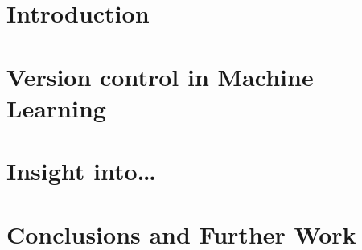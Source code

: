 \documentclass[11pt,english,a4paper,twoside]{article}
\title{\reporttitle}
\author{Peter Bartoš, Stanislav Krištof} %
\date{Faculty of Informatics and Information Technologies\\
      Slovak University of Technology in Bratislava\\[6pt]
      \today}
\begin{document}
\maketitle




\section{Introduction} \label{in}


\section{Version control in Machine Learning} \label{intro2ml}


\section{Insight into\ldots} \label{insight}





\section{Conclusions and Further Work} \label{cc}



\end{document}
